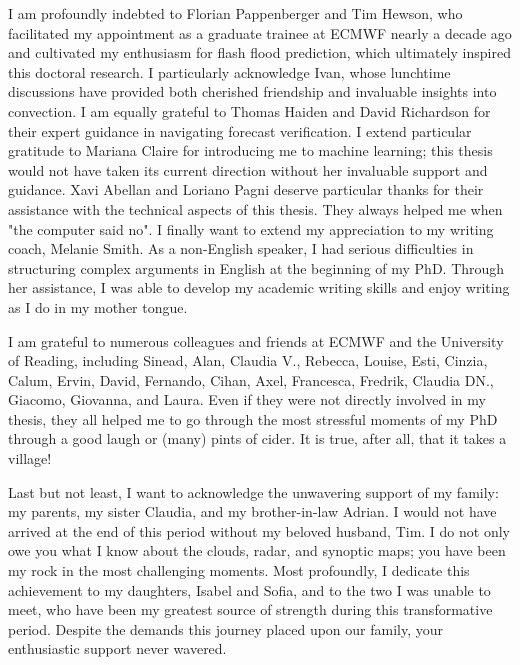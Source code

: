 \documentclass{thesis} %
\begin{document}
I am profoundly indebted to Florian Pappenberger and Tim Hewson, who facilitated my appointment as a graduate trainee at ECMWF nearly a decade ago and cultivated my enthusiasm for flash flood prediction, which ultimately inspired this doctoral research. I particularly acknowledge Ivan, whose lunchtime discussions have provided both cherished friendship and invaluable insights into convection. I am equally grateful to Thomas Haiden and David Richardson for their expert guidance in navigating forecast verification. I extend particular gratitude to Mariana Claire for introducing me to machine learning; this thesis would not have taken its current direction without her invaluable support and guidance. Xavi Abellan and Loriano Pagni deserve particular thanks for their assistance with the technical aspects of this thesis. They always helped me when "the computer said no". I finally want to extend my appreciation to my writing coach, Melanie Smith. As a non-English speaker, I had serious difficulties in structuring complex arguments in English at the beginning of my PhD. Through her assistance, I was able to develop my academic writing skills and enjoy writing as I do in my mother tongue.

I am grateful to numerous colleagues and friends at ECMWF and the University of Reading, including Sinead, Alan, Claudia V., Rebecca, Louise, Esti, Cinzia, Calum, Ervin, David, Fernando, Cihan, Axel, Francesca, Fredrik, Claudia DN., Giacomo, Giovanna, and Laura. Even if they were not directly involved in my thesis, they all helped me to go through the most stressful moments of my PhD through a good laugh or (many) pints of cider. It is true, after all, that it takes a village!

Last but not least, I want to acknowledge the unwavering support of my family: my parents, my sister Claudia, and my brother-in-law Adrian. I would not have arrived at the end of this period without my beloved husband, Tim. I do not only owe you what I know about the clouds, radar, and synoptic maps; you have been my rock in the most challenging moments. Most profoundly, I dedicate this achievement to my daughters, Isabel and Sofia, and to the two I was unable to meet, who have been my greatest source of strength during this transformative period. Despite the demands this journey placed upon our family, your enthusiastic support never wavered.


\newpage
\null
\newpage
\tableofcontents     %
\end{document}
